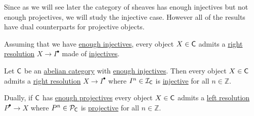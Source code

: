 \documentclass[../../main]{subfiles}
\begin{document}
Since as we will see later the category of sheaves has enough injectives but not enough projectives, we will study the injective case.
However all of the results have dual counterparts for projective objects.

Assuming that we have \hyperref[def:enough-injectives-projectives]{enough injectives}, every object \(X \in \mathsf{C}\) admits a \hyperref[def:resolution]{right resolution} \(X \to I^{\bullet}\) made of \hyperref[def:injective-projective-object]{injectives}.
\begin{theorem}\label{thm:existence-injective-resolution}
  Let \(\mathsf{C}\) be an \hyperref[def:abelian-category]{abelian category} with \hyperref[def:enough-injectives-projectives]{enough injectives}.
  Then every object \(X \in \mathsf{C}\) admits a \hyperref[def:resolution]{right resolution} \(X \to I^{\bullet}\) where \(I^{n} \in \mathcal{I}_{\mathsf{C}}\) is \hyperref[def:injective-projective-object]{injective} for all \(n \in \mathbb{Z}\).

  Dually, if \(\mathsf{C}\) has \hyperref[def:enough-injectives-projectives]{enough projectives} every object \(X \in \mathsf{C}\) admits a \hyperref[def:resolution]{left resolution} \(P^{\bullet} \to X\) where \(P^{n} \in \mathcal{P}_{\mathsf{C}}\) is \hyperref[def:injective-projective-object]{projective} for all \(n \in \mathbb{Z}\).
\end{theorem}
\end{document}
